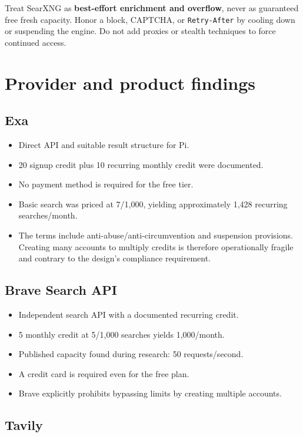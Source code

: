 \documentclass[11pt]{article}
\begin{document}
Treat SearXNG as \textbf{best-effort enrichment and overflow}, never as guaranteed free
fresh capacity.  Honor a block, CAPTCHA, or \texttt{Retry-After} by cooling down or
suspending the engine.  Do not add proxies or stealth techniques to force
continued access.
\section*{Provider and product findings}
\label{sec:org1e8901c}

\subsection*{Exa}
\label{sec:orgbf94166}

\begin{itemize}
\item Direct API and suitable result structure for Pi.
\item {}20 signup credit plus 10 recurring monthly credit were documented.
\item No payment method is required for the free tier.
\item Basic search was priced at 7/1,000, yielding approximately 1,428 recurring
searches/month.
\item The terms include anti-abuse/anti-circumvention and suspension provisions.
Creating many accounts to multiply credits is therefore operationally
fragile and contrary to the design's compliance requirement.
\end{itemize}
\subsection*{Brave Search API}
\label{sec:orgd25db6e}

\begin{itemize}
\item Independent search API with a documented recurring credit.
\item {}5 monthly credit at 5/1,000 searches yields 1,000/month.
\item Published capacity found during research: 50 requests/second.
\item A credit card is required even for the free plan.
\item Brave explicitly prohibits bypassing limits by creating multiple accounts.
\end{itemize}
\subsection*{Tavily}
\label{sec:orgf8240bb}
\end{document}
